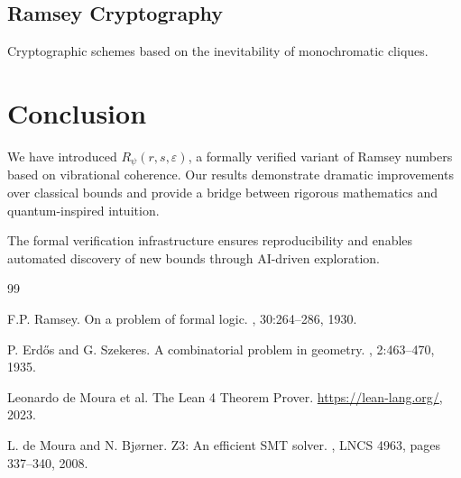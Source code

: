 \documentclass[11pt,a4paper]{article}
\theoremstyle{plain}
\theoremstyle{definition}
\theoremstyle{remark}
\begin{document}
\subsection{Ramsey Cryptography}
Cryptographic schemes based on the inevitability of monochromatic cliques.

\section{Conclusion}

We have introduced $R_\psi(r,s,\varepsilon)$, a formally verified variant of 
Ramsey numbers based on vibrational coherence. Our results demonstrate dramatic 
improvements over classical bounds and provide a bridge between rigorous 
mathematics and quantum-inspired intuition.

The formal verification infrastructure ensures reproducibility and enables 
automated discovery of new bounds through AI-driven exploration.


\begin{thebibliography}{99}

F.P. Ramsey.
\newblock On a problem of formal logic.
, 30:264--286, 1930.

P. Erdős and G. Szekeres.
\newblock A combinatorial problem in geometry.
, 2:463--470, 1935.

Leonardo de Moura et al.
\newblock The Lean 4 Theorem Prover.
\newblock \url{https://lean-lang.org/}, 2023.

L. de Moura and N. Bjørner.
\newblock Z3: An efficient SMT solver.
, LNCS 4963, pages 337--340, 2008.

\end{thebibliography}
\end{document}
